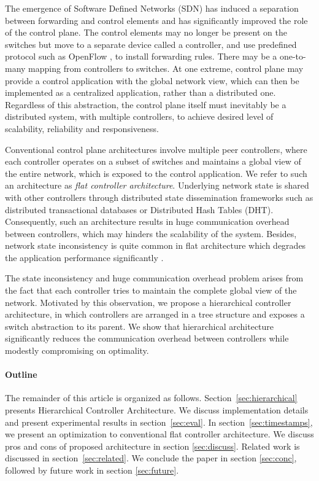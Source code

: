 \documentclass[10pt, twocolumn]{article}
\begin{document}
The emergence of Software Defined Networks (SDN) has induced a separation between forwarding and control elements and has significantly improved the role of the control plane. The control elements may no longer be present on the switches but move to a separate device called a controller, and use predefined protocol such as OpenFlow \cite{openflow}, to install forwarding rules. There may be a one-to-many mapping from controllers to switches. At one extreme, control plane may provide a control application with the global network view, which can then be implemented as a centralized application, rather than a distributed one. Regardless of this abstraction, the control plane itself must inevitably be a distributed system, with multiple controllers, to achieve desired level of scalability, reliability and responsiveness.

Conventional control plane architectures involve multiple peer controllers, where each controller operates on a subset of switches and maintains a global view of the entire network, which is exposed to the control application. We refer to such an architecture as \emph{flat controller architecture}. Underlying network state is shared with other controllers through distributed state dissemination frameworks such as distributed transactional databases or Distributed Hash Tables (DHT). Consequently, such an architecture results in huge communication overhead between controllers, which may hinders the scalability of the system. Besides, network state inconsistency is quite common in flat architecture which degrades the application performance significantly \cite{logically-centralized}.

The state inconsistency and huge communication overhead problem arises from the fact that each controller tries to maintain the complete global view of the network. Motivated by this observation, we propose a hierarchical controller architecture, in which controllers are arranged in a tree structure and exposes a switch abstraction to its parent. We show that hierarchical architecture significantly reduces the communication overhead between controllers while modestly compromising on optimality.     

\paragraph{Outline}
The remainder of this article is organized as follows. Section~\ref{sec:hierarchical} presents Hierarchical Controller Architecture. We discuss implementation details and present experimental results in section~\ref{sec:eval}. In section~\ref{sec:timestamps}, we present an optimization to conventional flat controller architecture. We discuss pros and cons of proposed architecture in section \ref{sec:discuss}. Related work is discussed in section~\ref{sec:related}. We conclude the paper in section \ref{sec:conc}, followed by future work in section \ref{sec:future}.  
\end{document}
